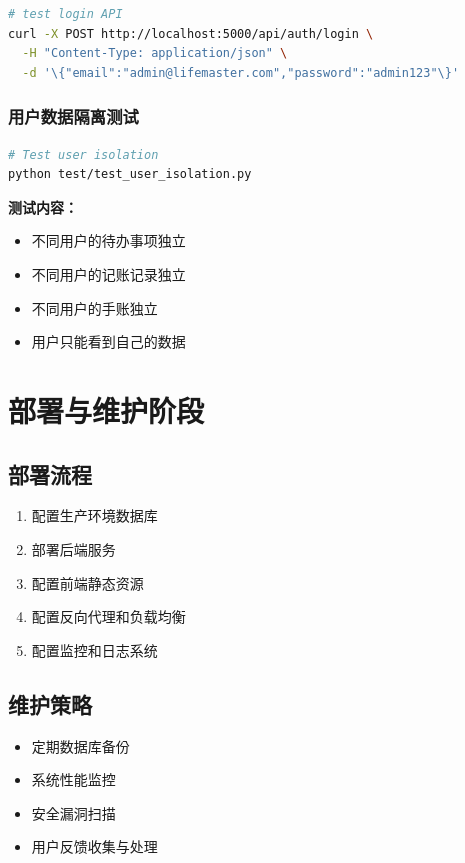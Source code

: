 \documentclass[a4paper]{article}
\begin{document}
\begin{lstlisting}[language=bash]
# test login API
curl -X POST http://localhost:5000/api/auth/login \
  -H "Content-Type: application/json" \
  -d '\{"email":"admin@lifemaster.com","password":"admin123"\}'
\end{lstlisting}

\subsubsection{用户数据隔离测试}

\begin{lstlisting}[language=bash]
# Test user isolation
python test/test_user_isolation.py
\end{lstlisting}

\textbf{测试内容：}
\begin{itemize}
    \item 不同用户的待办事项独立
    \item 不同用户的记账记录独立
    \item 不同用户的手账独立
    \item 用户只能看到自己的数据
\end{itemize}

\section{部署与维护阶段}

\subsection{部署流程}

\begin{enumerate}
    \item 配置生产环境数据库
    \item 部署后端服务
    \item 配置前端静态资源
    \item 配置反向代理和负载均衡
    \item 配置监控和日志系统
\end{enumerate}

\subsection{维护策略}

\begin{itemize}
    \item 定期数据库备份
    \item 系统性能监控
    \item 安全漏洞扫描
    \item 用户反馈收集与处理
\end{itemize}
\end{document}
